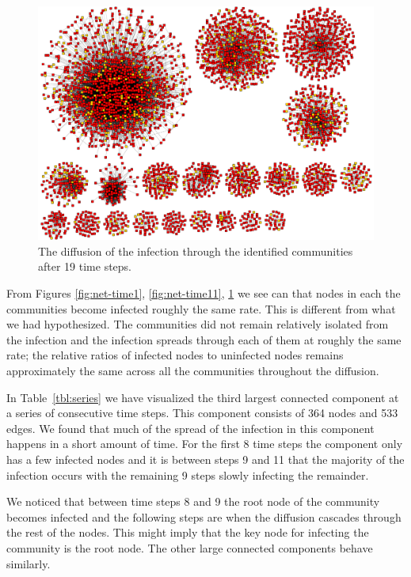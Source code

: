\documentclass[12pt, oneside, openany]{article} %
\begin{document}
\begin{figure}
\centering
    \includegraphics[scale=0.25]{step19.png}
    \caption{The diffusion of the infection through the identified communities after 19 time steps.}
    \label{fig:net-time19}
\end{figure}

From Figures \ref{fig:net-time1}, \ref{fig:net-time11}, \ref{fig:net-time19} we see can that nodes in each the communities become infected roughly the same rate. This is different from what we had hypothesized. The communities did not remain relatively isolated from the infection and the infection spreads through each of them at roughly the same rate; the relative ratios of infected nodes to uninfected nodes remains approximately the same across all the communities throughout the diffusion.

In Table~\ref{tbl:series} we have visualized the third largest connected component at a series of consecutive time steps. This component consists of 364 nodes and 533 edges. We found that much of the spread of the infection in this component happens in a short amount of time. For the first 8 time steps the component only has a few infected nodes and it is between steps 9 and 11 that the majority of the infection occurs with the remaining 9 steps slowly infecting the remainder.

We noticed that between time steps 8 and 9 the root node of the community becomes infected and the following steps are when the diffusion cascades through the rest of the nodes. This might imply that the key node for infecting the community is the root node. The other large connected components behave similarly.
\end{document}
